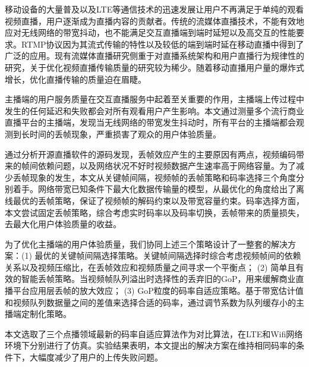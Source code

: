 \begin{cabstract}
移动设备的大量普及以及LTE等通信技术的迅速发展让用户不再满足于单纯的观看视频直播，用户逐渐成为直播内容的贡献者。传统的流媒体直播技术，不能有效地应对无线网络的带宽抖动，也不能满足交互直播端到端时延短以及高交互的性能要求。RTMP协议因为其流式传输的特性以及较低的端到端时延在移动直播中得到了广泛的应用。现有流媒体直播研究侧重于对直播系统架构和用户直播行为规律性的研究，关于优化视频直播传输质量的研究较为稀少。随着移动直播用户量的爆炸式增长，优化直播传输的质量迫在眉睫。

主播端的用户服务质量在交互直播服务中起着至关重要的作用，主播端上传过程中发生的任何延迟和失败都会对所有观看用户产生影响。本文通过测量多个流行商业直播平台的主播端，发现当无线网络的带宽发生抖动时，所有平台的主播端都会观测到长时间的丢帧现象，严重损害了观众的用户体验质量。

通过分析开源直播软件的源码发现，丢帧效应产生的主要原因有两点，视频编码带来的帧间依赖问题，以及网络状况不好时视频数据产生速率高于网络容量。为了减少丢帧现象的发生，本文从关键帧间隔，视频帧的丢帧策略和码率选择三个角度分别着手。网络带宽已知条件下最大化数据传输量的模型，从最优化的角度给出了离线最优的丢帧策略，保证了视频帧的解码约束以及带宽容量约束。码率选择方面，本文尝试固定丢帧策略，综合考虑实时码率以及码率切换，丢帧带来的质量损失，去最大化用户体验质量的收益。

为了优化主播端的用户体验质量，我们协同上述三个策略设计了一整套的解决方案：(1) 最优的关键帧间隔选择策略。关键帧间隔选择时综合考虑视频帧间的依赖关系以及视频压缩比，在丢帧效应和视频质量之间寻求一个平衡点；
(2) 简单且有效的智能丢帧策略。当视频帧队列溢出时选择性的丢弃旧的GoP，用来缓解商业直播平台应用层丢帧的放大效应；
(3) GoP粒度的码率自适应策略。基于带宽估计值和视频队列数据量之间的差值来选择合适的码率，通过调节系数为队列缓存小的主播端定制化策略。

本文选取了三个点播领域最新的码率自适应算法作为对比算法，在LTE和Wifi网络环境下分别进行了仿真。实验结果表明，本文提出的解决方案在维持相同码率的条件下，大幅度减少了用户的上传失败问题。
\end{cabstract}


